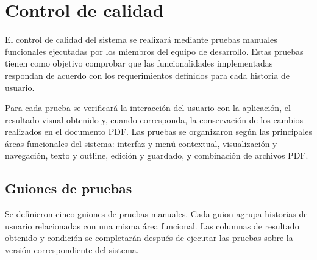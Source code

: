 \chapter{Control de calidad}
El control de calidad del sistema se realizará mediante pruebas manuales funcionales ejecutadas por los miembros del equipo de desarrollo. Estas pruebas tienen como objetivo comprobar que las funcionalidades implementadas respondan de acuerdo con los requerimientos definidos para cada historia de usuario.

Para cada prueba se verificará la interacción del usuario con la aplicación, el resultado visual obtenido y, cuando corresponda, la conservación de los cambios realizados en el documento PDF. Las pruebas se organizaron según las principales áreas funcionales del sistema: interfaz y menú contextual, visualización y navegación, texto y outline, edición y guardado, y combinación de archivos PDF.

\section{Guiones de pruebas}
Se definieron cinco guiones de pruebas manuales. Cada guion agrupa historias de usuario relacionadas con una misma área funcional. Las columnas de resultado obtenido y condición se completarán después de ejecutar las pruebas sobre la versión correspondiente del sistema.

